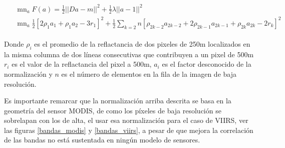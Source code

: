 \small
\begin{eqnarray}
\begin{aligned}
& \mathop{m\acute{i}n}_{a} F(a) = \frac{1}{2}||Da - m||^{2} + \frac{1}{2}\lambda ||a-1||^{2} \nonumber \\ 
& \mathop{m\acute{i}n}_{a} \frac{1}{2}[2\rho_{1}a_{1} + \rho_{1}a_{2} - 3r_{1}]^{2} + \frac{1}{2}\sum_{k=2}{n}[\rho_{2k-2}a_{2k-2}+2\rho_{2k-1}a_{2k-1}+\rho_{2k}a_{2k}-2r_{k}]^{2} \nonumber 
\end{aligned}
\end{eqnarray} 
\normalsize

Donde $\rho_{i}$ es el promedio de la reflactancia de dos pixeles de 250m localizados en la misma columna de dos líneas consecutivas que contribuyen a un pixel de 500m $r_{i}$ es el valor de la reflactancia del pixel a 500m, $a_{i}$ es el factor desconocido de la normalización y $n$ es el número de elementos en la fila de la imagen de baja resolución. 

Es importante remarcar que la normalización arriba descrita se basa en la geometría del sensor MODIS, de como los píxeles de baja resolución se sobrelapan con los de alta, el usar esa normalización para el caso de VIIRS, ver las figuras \ref{bandas_modis} y \ref{bandas_viirs}, a pesar de que mejora la correlación de las bandas no está sustentada en ningún modelo de sensores.  
